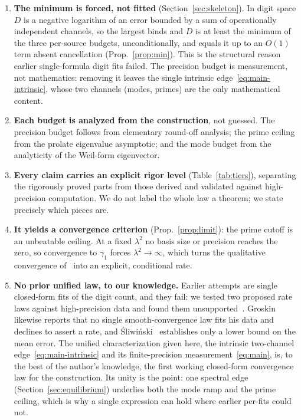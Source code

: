 \documentclass[11pt,a4paper]{article}
\begin{document}
\begin{enumerate}
\item \textbf{The minimum is forced, not fitted} (Section~\ref{sec:skeleton}).
  In digit space $D$ is a negative logarithm of an error bounded by a sum of
  operationally independent channels, so the largest binds and $D$ is at least
  the minimum of the three per-source budgets, unconditionally, and equals it up
  to an $O(1)$ term absent cancellation (Prop.~\ref{prop:min}). This is the
  structural reason earlier single-formula digit fits failed. The precision budget is measurement, not
  mathematics: removing it leaves the single intrinsic
  edge~\eqref{eq:main-intrinsic}, whose two channels (modes, primes) are the only
  mathematical content.
\item \textbf{Each budget is analyzed from the construction}, not guessed. The
  precision budget follows from elementary round-off analysis; the prime
  ceiling from the prolate eigenvalue asymptotic; and the mode budget from the
  analyticity of the Weil-form eigenvector.
\item \textbf{Every claim carries an explicit rigor level} (Table~\ref{tab:tiers}),
  separating the rigorously proved parts from those derived and validated
  against high-precision computation. We do not label the whole law a
  theorem; we state precisely which pieces are.
\item \textbf{It yields a convergence criterion} (Prop.~\ref{prop:limit}): the
  prime cutoff is an unbeatable ceiling. At a fixed $\lambda^2$ no basis size
  or precision reaches the zero, so convergence to $\gamma_1$ forces
  $\lambda^2\to\infty$, which turns the qualitative convergence
  of~\cite{CCM2025} into an explicit, conditional rate.
\item \textbf{No prior unified law, to our knowledge.} Earlier attempts are
  single closed-form fits of the digit count, and they fail: we tested two
  proposed rate laws against high-precision data and found them
  unsupported~\cite{AndrewsB}. Groskin~\cite{Groskin2026} likewise reports
  that no single smooth-convergence law fits his data and declines to assert a
  rate, and \'Sliwi\'nski~\cite{Sliwinski2026} establishes only a lower bound
  on the mean error. The unified characterization given here, the intrinsic
  two-channel edge~\eqref{eq:main-intrinsic} and its finite-precision
  measurement~\eqref{eq:main}, is, to the best of the author's knowledge, the
  first working closed-form convergence law for the construction. Its unity is
  the point: one spectral edge (Section~\ref{sec:equilibrium}) underlies both the
  mode ramp and the prime ceiling, which is why a single expression can hold
  where earlier per-fits could not.
\end{enumerate}
\end{document}
